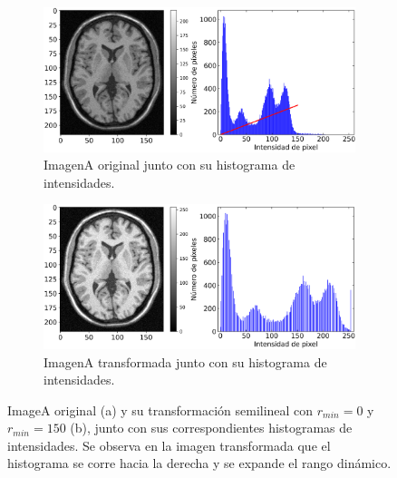 \documentclass[11pt,twocolumn,twoside]{opticajnl}
\begin{document}
\begin{figure}[h]
    \centering
         \begin{subfigure}[h]{\linewidth}
            \centering
            \includegraphics[width=\textwidth]{Figuras/ImageA_brute.png}
            \caption{ImagenA original junto con su histograma de intensidades.} 
         \end{subfigure}
         \begin{subfigure}[h]{\linewidth}
            \centering
            \includegraphics[width=\textwidth]{Figuras/ImageA_0_150.png}
            \caption{ImagenA transformada junto con su histograma de intensidades.}
         \end{subfigure}
    \caption{ImageA original (a) y su transformación semilineal con $r_{min} = 0$ y $r_{min} = 150$ (b), junto con sus correspondientes histogramas de intensidades. Se observa en la imagen transformada que el histograma se corre hacia la derecha y se expande el rango dinámico.}
    \label{fig:Semilineartrans}
\end{figure}
\end{document}
